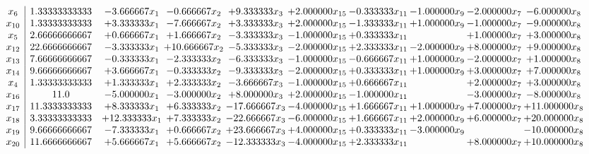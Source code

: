 \documentclass[10pt]{article}
\begin{document}
 \[\begin{array}{c| c c@{\hskip 2pt} c@{\hskip 2pt} c@{\hskip 2pt} c@{\hskip 2pt} c@{\hskip 2pt} c@{\hskip 2pt} c@{\hskip 2pt} c@{\hskip 2pt} }
 x_{6}   &  1.33333333333 & -3.666667 x_{1} & -0.666667 x_{2} & + 9.333333 x_{3} & + 2.000000 x_{15} & -0.333333 x_{11} & -1.000000 x_{9} & -2.000000 x_{7} & -6.000000 x_{8}\\
 x_{10}   &  1.33333333333 & + 3.333333 x_{1} & -7.666667 x_{2} & + 3.333333 x_{3} & + 2.000000 x_{15} & -1.333333 x_{11} & + 1.000000 x_{9} & -1.000000 x_{7} & -9.000000 x_{8}\\
 x_{5}   &  2.66666666667 & + 0.666667 x_{1} & + 1.666667 x_{2} & -3.333333 x_{3} & -1.000000 x_{15} & + 0.333333 x_{11} &   & + 1.000000 x_{7} & + 3.000000 x_{8}\\
 x_{12}   &  22.6666666667 & -3.333333 x_{1} & + 10.666667 x_{2} & -5.333333 x_{3} & -2.000000 x_{15} & + 2.333333 x_{11} & -2.000000 x_{9} & + 8.000000 x_{7} & + 9.000000 x_{8}\\
 x_{13}   &  7.66666666667 & -0.333333 x_{1} & -2.333333 x_{2} & -6.333333 x_{3} & -1.000000 x_{15} & -0.666667 x_{11} & + 1.000000 x_{9} & -2.000000 x_{7} & + 1.000000 x_{8}\\
 x_{14}   &  9.66666666667 & + 3.666667 x_{1} & -0.333333 x_{2} & -9.333333 x_{3} & -2.000000 x_{15} & + 0.333333 x_{11} & + 1.000000 x_{9} & + 3.000000 x_{7} & + 7.000000 x_{8}\\
 x_{4}   &  1.33333333333 & + 1.333333 x_{1} & + 2.333333 x_{2} & -3.666667 x_{3} & -1.000000 x_{15} & + 0.666667 x_{11} &   & + 2.000000 x_{7} & + 3.000000 x_{8}\\
 x_{16}   &  11.0 & -5.000000 x_{1} & -3.000000 x_{2} & + 8.000000 x_{3} & + 2.000000 x_{15} & -1.000000 x_{11} &   & -3.000000 x_{7} & -8.000000 x_{8}\\
 x_{17}   &  11.3333333333 & + 8.333333 x_{1} & + 6.333333 x_{2} & -17.666667 x_{3} & -4.000000 x_{15} & + 1.666667 x_{11} & + 1.000000 x_{9} & + 7.000000 x_{7} & + 11.000000 x_{8}\\
 x_{18}   &  3.33333333333 & + 12.333333 x_{1} & + 7.333333 x_{2} & -22.666667 x_{3} & -6.000000 x_{15} & + 1.666667 x_{11} & + 2.000000 x_{9} & + 6.000000 x_{7} & + 20.000000 x_{8}\\
 x_{19}   &  9.66666666667 & -7.333333 x_{1} & + 0.666667 x_{2} & + 23.666667 x_{3} & + 4.000000 x_{15} & + 0.333333 x_{11} & -3.000000 x_{9} &   & -10.000000 x_{8}\\
 x_{20}   &  11.6666666667 & + 5.666667 x_{1} & + 5.666667 x_{2} & -12.333333 x_{3} & -4.000000 x_{15} & + 2.333333 x_{11} &   & + 8.000000 x_{7} & + 10.000000 x_{8}\\

\end{array}\]
\end{document}
